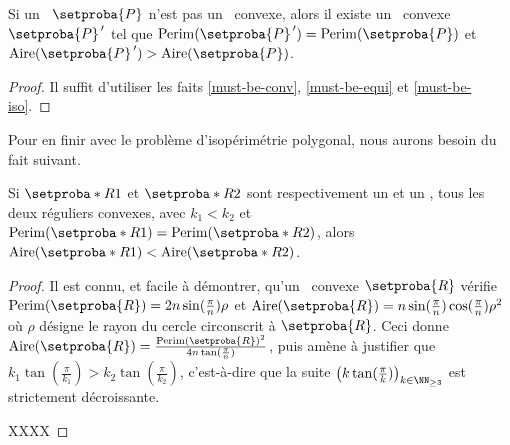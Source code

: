 \begin{fact} \label{must-be-reg}
	Si un \ngone\ $\setproba{P}$ n'est pas un \nreg\ convexe,
	alors il existe un \ngone\ convexe $\primeit{\setproba{P}}$ tel que
	$\perim{\primeit{\setproba{P}}} = \perim{\setproba{P}}$
	et
	$\area{\primeit{\setproba{P}}} > \area{\setproba{P}}$.
\end{fact}


\begin{proof}
	Il suffit d'utiliser les faits \ref{must-be-conv}, \ref{must-be-equi} et \ref{must-be-iso}.
\end{proof}




Pour en finir avec le problème d'isopérimétrie polygonal, nous aurons besoin du fait suivant.


\begin{fact} \label{nregs-sorting}
	Si $\setproba*{R}{1}$ et $\setproba*{R}{2}$ sont respectivement un  et un , tous les deux réguliers convexes, avec 
	$k_1 < k_2$ et $\perim{\setproba*{R}{1}} = \perim{\setproba*{R}{2}}$,
	alors
	$\area{\setproba*{R}{1}} < \area{\setproba*{R}{2}}$.
\end{fact}


\begin{proof}
    Il est connu, et facile à démontrer, qu'un \nreg\ convexe $\setproba{R}$ vérifie
    $\perim{\setproba{R}} = 2 n \sin (\frac{\pi}{n}) \rho$
    et
	$\area{\setproba{R}} = n \sin (\frac{\pi}{n})  \cos (\frac{\pi}{n}) \rho^2$
	où $\rho$ désigne le rayon du cercle circonscrit à $\setproba{R}$.
	Ceci donne 
	$\area{\setproba{R}} = \frac{\perim{\setproba{R}}^2}{4 n \tan (\frac{\pi}{n})}$,
	puis amène à justifier que 
	$k_1 \tan (\frac{\pi}{k_1}) > k_2 \tan (\frac{\pi}{k_2})$,
	c'est-à-dire que la suite $\big( k \tan (\frac{\pi}{k}) \big)_{k \in \NN_{\geq 3}}$ est strictement décroissante.
	
	
	XXXX
\end{proof}

